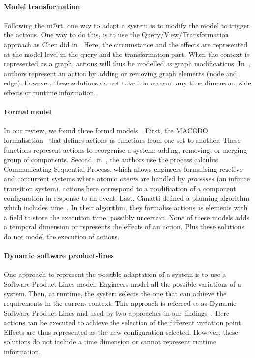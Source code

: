 \paragraph{Model transformation}
Following the \gls{m@rt}, one way to adapt a system is to modify the model to trigger the actions.
One way to do this, is to use the Query/View/Transformation~\cite{QVT:Spec} approach as Chen \etal did in \cite{DBLP:conf/icse/ChenPYNZ14}.
Here, the \gls{circumstance} and the effects are represented at the model level in the query and the transformation part.
When the context is represented as a graph, \glspl{action} will thus be modelled as graph modifications.
In~\cite{DBLP:journals/tse/KramerM90}, authors represent an action by adding or removing graph elements (node and edge).
However, these solutions do not take into account any time dimension, side effects or runtime information.
	
\paragraph{Formal model}
In our review, we found three formal models~\cite{DBLP:journals/taas/WeynsHH10, DBLP:conf/icse/BartelsK11, DBLP:conf/aaai/CimattiMR15}.
First, the MACODO formalisation~\cite{DBLP:journals/taas/WeynsHH10} that defines actions as functions from one set to another.
These functions represent actions to reorganise a system: adding, removing, or merging group of components.
Second, in~\cite{DBLP:conf/icse/BartelsK11}, the authors use the process calculus Communicating Sequential Process, which allows engineers formalising reactive and concurrent systems where atomic \textit{events} are handled by \textit{processes} (an infinite transition system).
\Glspl{action} here correspond to a modification of a component configuration in response to an event.
Last, Cimatti \etal defined a planning algorithm which includes time~\cite{DBLP:conf/aaai/CimattiMR15}.
In their algorithm, they formalise \glspl{action} as elements with a field to store the execution time, possibly uncertain.
None of these models adds a temporal dimension or represents the effects of an action.
Plus these solutions do not model the execution of \glspl{action}.

\paragraph{Dynamic software product-lines}
One approach to represent the possible adaptation of a system is to use a Software Product-Lines model.
Engineers model all the possible variations of a system.
Then, at runtime, the system selects the one that can achieve the requirements in the current context.
This approach is referred to as Dynamic Software Product-Lines and used by two approaches in our findings~\cite{DBLP:conf/dagstuhl/GhezziS10, DBLP:series/lncs/CordyCHLS13}.
Here \glspl{action} can be executed to achieve the selection of the different variation point.
Effects are thus represented as the new configuration selected.
However, these solutions do not include a time dimension or cannot represent runtime information.

